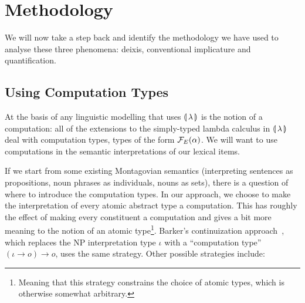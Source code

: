 \section{Methodology}
\label{sec:methodology}

We will now take a step back and identify the methodology we have used to
analyse these three phenomena: deixis, conventional implicature and
quantification.


\subsection{Using Computation Types}
\label{ssec:methodology-computation-types}

At the basis of any linguistic modelling that uses $\llparenthesis \, \lambda \, \rrparenthesis$ is
the notion of a computation: all of the extensions to the simply-typed
lambda calculus in $\llparenthesis \, \lambda \, \rrparenthesis$ deal with computation types, types of
the form $\mathcal{F}_E(\alpha)$. We will want to use computations in the semantic
interpretations of our lexical items.

If we start from some existing Montagovian semantics (interpreting
sentences as propositions, noun phrases as individuals, nouns as sets),
there is a question of where to introduce the computation types. In our
approach, we choose to make the interpretation of every atomic abstract
type a computation. This has roughly the effect of making every constituent
a computation and gives a bit more meaning to the notion of an atomic
type\footnote{Meaning that this strategy constrains the choice of atomic
  types, which is otherwise somewhat arbitrary.}. Barker's continuization
approach~\cite{barker2002continuations}, which replaces the NP
interpretation type $\iota$ with a ``computation type''
$(\iota \to o) \to o$, uses the same strategy. Other possible strategies
include:

